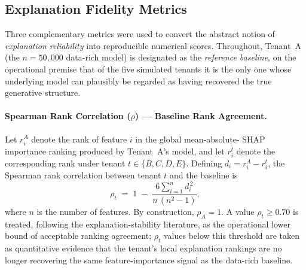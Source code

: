 \subsection{Explanation Fidelity Metrics}
\label{subsec:fid-metrics}

Three complementary metrics were used to convert the abstract notion of
\emph{explanation reliability} into reproducible numerical scores.
Throughout, Tenant~A (the $n = 50{,}000$ data-rich model) is designated as
the \emph{reference baseline}, on the operational premise that of the five
simulated tenants it is the only one whose underlying model can plausibly
be regarded as having recovered the true generative structure.

\paragraph{Spearman Rank Correlation ($\rho$) --- Baseline Rank Agreement.}
Let $r^{A}_i$ denote the rank of feature $i$ in the global mean-absolute-
SHAP importance ranking produced by Tenant~A's model, and let $r^{t}_i$
denote the corresponding rank under tenant $t \in \{B, C, D, E\}$.
Defining $d_i = r^{A}_i - r^{t}_i$, the Spearman rank correlation between
tenant $t$ and the baseline is
\begin{equation}
\rho_t \;=\; 1 \;-\; \frac{6 \sum_{i=1}^{n} d_i^{\,2}}{n\,(n^2 - 1)},
\label{eq:spearman-meth}
\end{equation}
where $n$ is the number of features. By construction, $\rho_A = 1$. A value
$\rho_t \ge 0.70$ is treated, following the explanation-stability
literature, as the operational lower bound of acceptable ranking agreement;
$\rho_t$ values below this threshold are taken as quantitative evidence
that the tenant's local explanation rankings are no longer recovering the
same feature-importance signal as the data-rich baseline.

